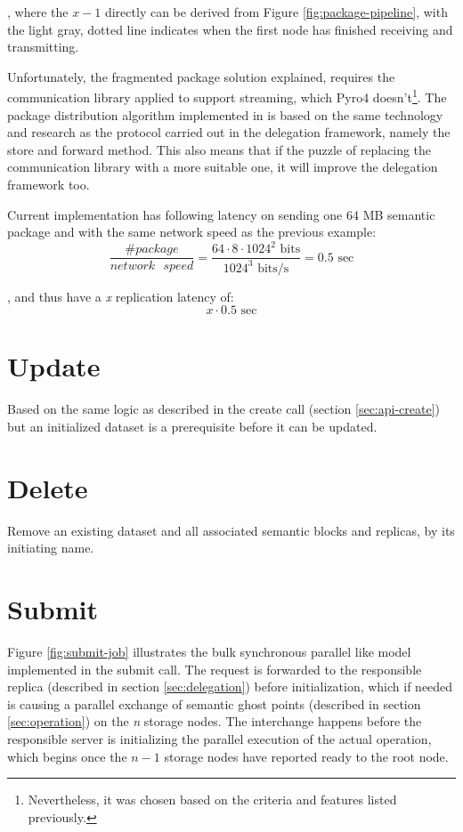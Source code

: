 , where the $x - 1$ directly can be derived from Figure \ref{fig:package-pipeline}, with the light gray, dotted line indicates when the first node has finished receiving and transmitting.
\newline

\noindent
Unfortunately, the fragmented package solution explained, requires the communication library applied to support streaming, which Pyro4 doesn't\footnote{Nevertheless, it was chosen based on the criteria and features listed previously.}. The package distribution algorithm implemented in \CodeName is based on the same technology and research as the protocol carried out in the delegation framework, namely the store and forward method. This also means that if the puzzle of replacing the communication library with a more suitable one, it will improve the delegation framework too.
\newline

Current implementation has following latency on sending one 64 MB semantic package and with the same network speed as the previous example:
\vspace*{1mm}
\begin{equation}
	\dfrac{\texttt{\#}package}{network\text{ }speed} = \dfrac{64\cdot 8\cdot 1024^2 \text{ bits}}{1024^3 \text{ bits/s}} = 0.5 \text{ sec}
\end{equation}
\vspace*{2mm}

\noindent
, and thus have a \textit{x} replication latency of:
\begin{equation}
	x \cdot 0.5 \text{ sec}
\end{equation}
 
\section{Update}
Based on the same logic as described in the create call (section \ref{sec:api-create}) but an initialized dataset is a prerequisite before it can be updated.

\section{Delete}
Remove an existing dataset and all associated semantic blocks and replicas, by its 	initiating name.

\section{Submit} \label{sec:submit}
Figure \ref{fig:submit-job} illustrates the bulk synchronous parallel like model implemented in the submit call. The request is forwarded to the responsible replica (described in section \ref{sec:delegation}) before initialization, which if needed is causing a parallel exchange of semantic ghost points (described in section \ref{sec:operation}) on the \textit{n} storage nodes. The interchange happens before the responsible server is initializing the parallel execution of the actual operation, which begins once the $n-1$ storage nodes have reported ready to the root node.
\newline

